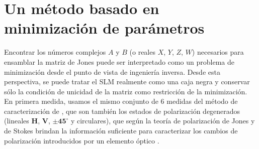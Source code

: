 
\section{Un método basado en minimización de parámetros}
Encontrar los números complejos $A$ y $B$ (o reales $X$, $Y$, $Z$,
$W$) necesarios para ensamblar la
matriz de Jones puede ser interpretado como un problema de
minimización desde el punto de vista de ingeniería inversa. Desde esta
perspectiva, se puede tratar el SLM realmente como una caja negra y
conservar sólo la condición de unicidad de la matriz
como restricción de la minimización.  
En primera medida, usamos el mismo conjunto de 6 medidas 
del método de caracterización 
de , que son también los estados de polarización
degenerados (lineales
$\mathbf{H}$, $\mathbf{V}$, $\mathbf{\pm 45^{\circ}}$ y circulares), que según la
teoría de polarización de Jones y de Stokes brindan la información suficiente para
caracterizar los cambios de polarización introducidos por un elemento
óptico .
